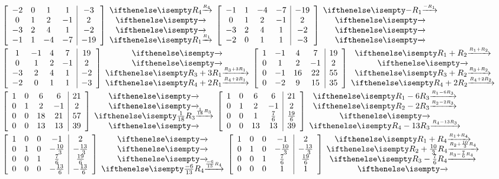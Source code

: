 \documentclass[
  letterpaper,
  DIV=11,
  numbers=noendperiod]{scrartcl}
\begin{document}
\begin{align*}
&\left[\begin{array}{cccc|c}-2 & 0 & 1 & 1 & -3 \\ 0 & 1 & 2 & -1 & 2 \\ -3 & 2 & 4 & 1 & -2 \\ -1 & 1 & -4 & -7 & -19\end{array}\right]\rowops{R_4,,,R_1}\left[\begin{array}{cccc|c} -1 & 1 & -4 & -7 & -19 \\ 0 & 1 & 2 & -1 & 2 \\ -3 & 2 & 4 & 1 & -2 \\ -2 & 0 & 1 & 1 & -3\end{array}\right]\rowops{-R_1,,,} \\
&\left[\begin{array}{cccc|c} 1 & -1 & 4 & 7 & 19 \\  0 & 1 & 2 & -1 & 2 \\ -3 & 2 & 4 & 1 & -2 \\ -2 & 0 & 1 & 1 & -3\end{array}\right]\rowops{,,R_3+3R_1,R_4+2R_1}\left[\begin{array}{cccc|c} 1 & -1 & 4 & 7 & 19 \\ 0 & 1 & 2 & -1 & 2 \\ 0 & -1 & 16 & 22 & 55 \\ 0 & -2 & 9 & 15 & 35\end{array}\right]\rowops{R_1+R_2,,R_3+R_2,R_4+2R_2} \\
&\left[\begin{array}{cccc|c}1 & 0 & 6 & 6 & 21 \\ 0 & 1 & 2 & -1 & 2 \\ 0 & 0 & 18 & 21 & 57 \\ 0 & 0 & 13 & 13 & 39 \end{array}\right]\rowops{,,\frac{1}{18}R_3,}\left[\begin{array}{cccc|c}1 & 0 & 6 & 6 & 21 \\ 0 & 1 & 2 & -1 & 2 \\ 0 & 0 & 1 & \frac{7}{6} & \frac{19}{6} \\ 0 & 0 & 13 & 13 & 39 \end{array}\right]\rowops{R_1-6R_3,R_2-2R_3,,R_4-13R_3} \\
&\left[\begin{array}{cccc|c}1 & 0 & 0 & -1 & 2 \\ 0 & 1 & 0 & -\frac{10}{3} & -\frac{13}{3} \\ 0 & 0 & 1 & \frac{7}{6} & \frac{19}{6} \\ 0 & 0 & 0 & -\frac{13}{6} & -\frac{13}{6} \end{array}\right]\rowops{,,,\frac{-6}{13}R_4}\left[\begin{array}{cccc|c}1 & 0 & 0 & -1 & 2 \\ 0 & 1 & 0 & -\frac{10}{3} & -\frac{13}{3} \\ 0 & 0 & 1 & \frac{7}{6} & \frac{19}{6} \\ 0 & 0 & 0 & 1 & 1 \end{array}\right]\rowops{R_1+R_4,R_2+\frac{10}{3}R_4,R_3-\frac{7}{6}R_4,} \\

\end{align*}
\end{document}
